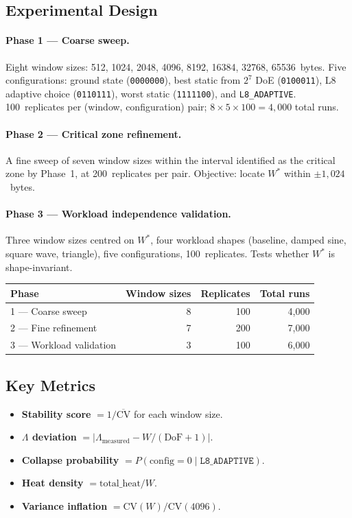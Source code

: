 \subsection{Experimental Design}

\paragraph{Phase 1 — Coarse sweep.}
Eight window sizes: 512, 1024, 2048, 4096, 8192, 16384, 32768, 65536~bytes.
Five configurations: ground state (\texttt{0000000}), best static from
$2^7$ DoE (\texttt{0100011}), L8 adaptive choice (\texttt{0110111}), worst
static (\texttt{1111100}), and \texttt{L8\_ADAPTIVE}. 100~replicates per
(window, configuration) pair; $8 \times 5 \times 100 = 4{,}000$ total runs.

\paragraph{Phase 2 — Critical zone refinement.}
A fine sweep of seven window sizes within the interval identified as the
critical zone by Phase~1, at 200~replicates per pair. Objective: locate
$W^*$ within $\pm 1{,}024$~bytes.

\paragraph{Phase 3 — Workload independence validation.}
Three window sizes centred on $W^*$, four workload shapes (baseline, damped
sine, square wave, triangle), five configurations, 100~replicates. Tests
whether $W^*$ is shape-invariant.

\begin{center}
\begin{tabular}{lrrr}
\toprule
Phase & Window sizes & Replicates & Total runs \\
\midrule
1 — Coarse sweep & 8 & 100 & 4{,}000 \\
2 — Fine refinement & 7 & 200 & 7{,}000 \\
3 — Workload validation & 3 & 100 & 6{,}000 \\
\bottomrule
\end{tabular}
\end{center}

\subsection{Key Metrics}

\begin{itemize}
  \item \textbf{Stability score} $= 1/\overline{\mathrm{CV}}$ for each
        window size.
  \item \textbf{$\Lambda$ deviation} $= |\Lambda_{\text{measured}} -
        W/(\mathrm{DoF}+1)|$.
  \item \textbf{Collapse probability} $= P(\text{config} = 0 \mid
        \texttt{L8\_ADAPTIVE})$.
  \item \textbf{Heat density} $= \text{total\_heat} / W$.
  \item \textbf{Variance inflation} $= \mathrm{CV}(W) / \mathrm{CV}(4096)$.
\end{itemize}

